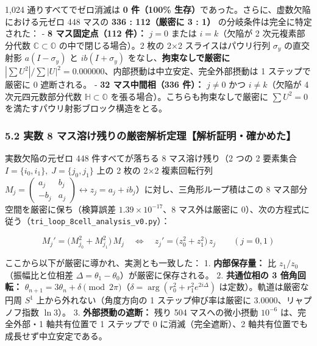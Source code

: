 \documentclass[
  a4paper,
]{ltjsarticle}
\begin{document}
1,024 通りすべてでゼロ消滅は \textbf{0 件（100\%
生存）}であった。さらに、虚数欠陥における元ゼロ 448 マスの \textbf{336 :
112（厳密に 3 : 1）} の分岐条件は完全に特定された： - \textbf{8
マス固定点（112 件）：} \(j = 0\) または \(i = k\)（欠陥が 2
次元複素部分代数 \(\mathbb{C} \subset \mathbb{O}\) の中で閉じる場合）。2
枚の 2×2 スライスはパウリ行列 \(\sigma_y\) の直交射影
\(a(I - \sigma_y)\) と \(ib(I + \sigma_y)\)
をなし、\textbf{拘束なしで厳密に
\(|\sum U^2| / \sum |U|^2 = 0.000000\)}、内部摂動は中立安定、完全外部摂動は
1 ステップで厳密に 0 遮断される。 - \textbf{32 マス中間相（336 件）：}
\(j \neq 0\) かつ \(i \neq k\)（欠陥が 4 次元四元数部分代数
\(\mathbb{H} \subset \mathbb{O}\) を張る場合）。こちらも拘束なしで厳密に
\(\sum U^2 = 0\) を満たすパウリ射影ブロック構造をとる。

\subsubsection{5.2 実数 8
マス溶け残りの厳密解析定理【解析証明・確かめた】}\label{ux5b9fux6570-8-ux30deux30b9ux6eb6ux3051ux6b8bux308aux306eux53b3ux5bc6ux89e3ux6790ux5b9aux7406ux89e3ux6790ux8a3cux660eux78baux304bux3081ux305f}

実数欠陥の元ゼロ 448 件すべてが落ちる 8 マス溶け残り（2 つの 2 要素集合
\(I = \{i_0, i_1\},\; J = \{j_0, j_1\}\) 上の 2 枚の 2×2 複素回転行列
\(M_j = \begin{pmatrix} a_j & b_j \\ -b_j & a_j \end{pmatrix} \leftrightarrow z_j = a_j + i b_j\)）に対し、三角形ループ積はこの
8 マス部分空間を厳密に保ち（検算誤差 \(1.39 \times 10^{-17}\)、8
マス外は厳密に
0）、次の方程式に従う（\texttt{tri\_\allowbreak{}loop\_\allowbreak{}8cell\_\allowbreak{}analysis\_\allowbreak{}v0.py}）：

\[M_j' = \bigl(M_{j_0}^2 + M_{j_1}^2\bigr)\, M_j \quad \Longleftrightarrow \quad z_j' = \bigl(z_0^2 + z_1^2\bigr)\, z_j \qquad (j = 0, 1) \tag{3}\]

ここから以下が厳密に導かれ、実測とも一致した： 1. \textbf{内部保存量：}
比 \(z_1 / z_0\)（振幅比と位相差
\(\Delta = \theta_1 - \theta_0\)）が厳密に保存される。 2.
\textbf{共通位相の 3 倍角回転：}
\(\theta_{n+1} = 3\theta_n + \delta \pmod{2\pi}\)（\(\delta = \arg(r_0^2 + r_1^2 e^{2i\Delta})\)
は定数）。軌道は厳密な円周 \(S^1\) 上から外れない（角度方向の 1
ステップ伸び率は厳密に 3.0000、リャプノフ指数 \(\ln 3\)）。 3.
\textbf{外部摂動の遮断：} 残り 504 マスへの微小摂動 \(10^{-6}\)
は、完全外部・1 軸共有位置で 1 ステップで 0 に消滅（完全遮断）、2
軸共有位置でも成長せず中立安定である。
\end{document}
